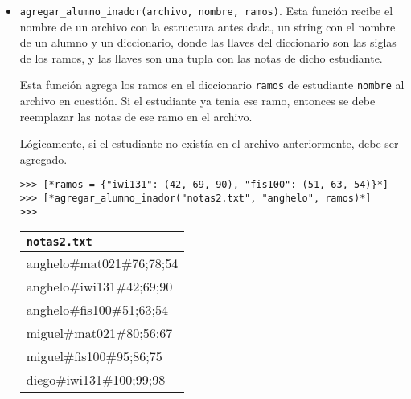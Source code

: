 \begin{itemize}
    \item \texttt{agregar\_alumno\_inador(archivo, nombre, ramos)}. Esta función recibe el nombre de un archivo con la estructura antes dada, un string con el nombre de un alumno y un diccionario, donde las llaves del diccionario son las siglas de los ramos, y las llaves son una tupla con las notas de dicho estudiante.
    
    Esta función agrega los ramos en el diccionario \texttt{ramos} de estudiante \texttt{nombre} al archivo en cuestión. Si el estudiante ya tenia ese ramo, entonces se debe reemplazar las notas de ese ramo en el archivo.
    
    Lógicamente, si el estudiante no existía en el archivo anteriormente, debe ser agregado.
    
    \begin{lstlisting}[style=consola]
>>> [*ramos = {"iwi131": (42, 69, 90), "fis100": (51, 63, 54)}*]
>>> [*agregar_alumno_inador("notas2.txt", "anghelo", ramos)*]
>>> 
    \end{lstlisting}

\begin{center}
\begin{tabular}{|l|}
    \hline
    \texttt{notas2.txt} \\ 
    \hline
    anghelo\#mat021\#76;78;54 \\
    anghelo\#iwi131\#42;69;90 \\
    anghelo\#fis100\#51;63;54 \\
    miguel\#mat021\#80;56;67 \\
    miguel\#fis100\#95;86;75 \\
    diego\#iwi131\#100;99;98 \\
    \hline
\end{tabular}
\end{center}
\end{itemize}
